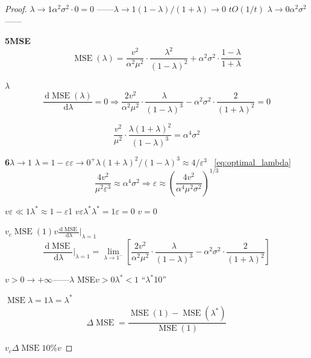 \documentclass[11pt,a4paper]{article}
\theoremstyle{remark}
\DeclareMathOperator{\MSE}{MSE}
\newcommand{\dd}{\,\mathrm{d}}
\begin{document}
\begin{proof}
\textbf{}$\lambda \to 1$$\alpha^2\sigma^2 \cdot 0 = 0$
——$\lambda \to 1$$(1-\lambda)/(1+\lambda) \to 0$
$t$$O(1/t)$
$\lambda \to 0$$\alpha^2\sigma^2$——

\textbf{5MSE}
\begin{equation}\label{eq:mse_lambda}
    \MSE(\lambda) = \frac{v^2}{\alpha^2\mu^2} \cdot \frac{\lambda^2}{(1-\lambda)^2}
    + \alpha^2\sigma^2 \cdot \frac{1-\lambda}{1+\lambda}
\end{equation}

$\lambda$
\begin{equation}
    \frac{\dd \MSE(\lambda)}{\dd \lambda} = 0
    \Longrightarrow
    \frac{2v^2}{\alpha^2\mu^2} \cdot \frac{\lambda}{(1-\lambda)^3}
    - \alpha^2\sigma^2 \cdot \frac{2}{(1+\lambda)^2} = 0
\end{equation}


\begin{equation}\label{eq:optimal_lambda}
    \frac{v^2}{\mu^2} \cdot \frac{\lambda(1+\lambda)^2}{(1-\lambda)^3} = \alpha^4 \sigma^2
\end{equation}

\textbf{6}$\lambda \to 1$
$\lambda = 1 - \varepsilon$$\varepsilon \to 0^+$$\lambda(1+\lambda)^2/(1-\lambda)^3 \approx 4/\varepsilon^3$
~\eqref{eq:optimal_lambda}
\begin{equation}
    \frac{4v^2}{\mu^2\varepsilon^3} \approx \alpha^4 \sigma^2
    \Longrightarrow
    \varepsilon \approx \left(\frac{4v^2}{\alpha^4\mu^2\sigma^2}\right)^{1/3}
\end{equation}

$v$$\varepsilon \ll 1$$\lambda^* \approx 1 - \varepsilon$1
$v$$\varepsilon$$\lambda^*$$\lambda^* = 1$$\varepsilon = 0$
$v = 0$

$v_c$$\MSE(1)$$v$$\frac{\dd \MSE}{\dd \lambda}\big|_{\lambda=1}$
\begin{equation}
    \frac{\dd \MSE}{\dd \lambda}\Big|_{\lambda=1}
    = \lim_{\lambda \to 1^-} \left[\frac{2v^2}{\alpha^2\mu^2} \cdot \frac{\lambda}{(1-\lambda)^3}
    - \alpha^2\sigma^2 \cdot \frac{2}{(1+\lambda)^2}\right]
\end{equation}

$v > 0$$\to +\infty$——$\lambda$
MSE$v > 0$$\lambda^* < 1$
``$\lambda^*$10''

$\MSE$$\lambda=1$$\lambda=\lambda^*$\textbf{}
\begin{equation}
    \Delta\MSE = \frac{\MSE(1) - \MSE(\lambda^*)}{\MSE(1)}
\end{equation}

$v_c$$\Delta\MSE$$10\%$$v$


\end{proof}
\end{document}
